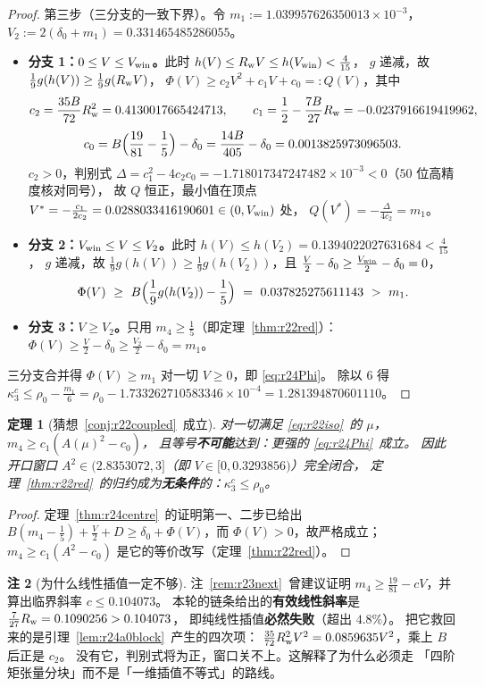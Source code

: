 \documentclass[UTF8,11pt]{ctexart}
\newtheorem{theorem}{定理}[section]
\theoremstyle{definition}
\newtheorem{remark}[theorem]{注}
\begin{document}
\begin{proof}
第三步（三分支的一致下界）。令
$m_1:=1.039957626350013\times10^{-3}$，$V_2:=2(\delta_0+m_1)=0.331465485286055$。
\begin{itemize}\itemsep3pt
\item \textbf{分支 1：$0\le V\le V_{\rm win}$。}此时 $h(V)\le R_{\rm w}V\le h(V_{\rm win})<\frac4{15}$，
$g$ 递减，故 $\frac19g(h(V))\ge\frac19g(R_{\rm w}V)$，
$\Phi(V)\ge c_2V^2+c_1V+c_0=:Q(V)$，其中
\[
c_2=\frac{35B}{72}R_{\rm w}^2=0.4130017665424713,\qquad
c_1=\frac12-\frac{7B}{27}R_{\rm w}=-0.0237916619419962,
\]
\[
c_0=B\Bigl(\frac{19}{81}-\frac15\Bigr)-\delta_0=\frac{14B}{405}-\delta_0=0.0013825973096503 .
\]
$c_2>0$，判别式 $\Delta=c_1^2-4c_2c_0=-1.718017347247482\times10^{-3}<0$（$50$ 位高精度核对同号），
故 $Q$ 恒正，最小值在顶点 $V^*=-\frac{c_1}{2c_2}=0.0288033416190601\in(0,V_{\rm win})$ 处，
$Q(V^*)=-\frac{\Delta}{4c_2}=m_1$。
\item \textbf{分支 2：$V_{\rm win}\le V\le V_2$。}此时 $h(V)\le h(V_2)=0.1394022027631684<\frac4{15}$，
$g$ 递减，故 $\frac19g(h(V))\ge\frac19g(h(V_2))$，且 $\frac V2-\delta_0\ge\frac{V_{\rm win}}2-\delta_0=0$，
\[
\Phi(V)\ \ge\ B\Bigl(\frac19g(h(V_2))-\frac15\Bigr)\ =\ 0.037825275611143\ >\ m_1 .
\]
\item \textbf{分支 3：$V\ge V_2$。}只用 $m_4\ge\frac15$（即定理~\ref{thm:r22red}）：
$\Phi(V)\ge\frac V2-\delta_0\ge\frac{V_2}2-\delta_0=m_1$。
\end{itemize}
三分支合并得 $\Phi(V)\ge m_1$ 对一切 $V\ge0$，即 \eqref{eq:r24Phi}。
除以 $6$ 得 $\kappa_3^c\le\rho_0-\frac{m_1}6=\rho_0-1.733262710583346\times10^{-4}=1.281394870601110$。
\end{proof}

\begin{theorem}[猜想~\ref{conj:r22coupled}~成立]\label{thm:r24conj}
对一切满足 \eqref{eq:r22iso}~的 $\mu$，$m_4\ge c_1(A(\mu)^2-c_0)$，
且等号\textbf{不可能}达到：更强的 \eqref{eq:r24Phi}~成立。
因此开口窗口 $A^2\in(2.8353072,3]$（即 $V\in[0,0.3293856)$）完全闭合，
定理~\ref{thm:r22red}~的归约成为\textbf{无条件}的：$\kappa_3^c\le\rho_0$。
\end{theorem}

\begin{proof}
定理~\ref{thm:r24centre}~的证明第一、二步已给出
$B(m_4-\frac15)+\frac V2+D\ge\delta_0+\Phi(V)$，而 $\Phi(V)>0$，故严格成立；
$m_4\ge c_1(A^2-c_0)$ 是它的等价改写（定理~\ref{thm:r22red}）。
\end{proof}

\begin{remark}[为什么线性插值一定不够]\label{rem:r24slope}
注~\ref{rem:r23next}~曾建议证明 $m_4\ge\frac{19}{81}-cV$，并算出临界斜率 $c\le0.104073$。
本轮的链条给出的\textbf{有效线性斜率}是 $\frac7{27}R_{\rm w}=0.1090256>0.104073$，
即纯线性插值\textbf{必然失败}（超出 $4.8\%$）。
把它救回来的是引理~\ref{lem:r24a0block}~产生的四次项：
$\frac{35}{72}R_{\rm w}^2V^2=0.0859635V^2$，乘上 $B$ 后正是 $c_2$。
没有它，判别式将为正，窗口关不上。这解释了为什么必须走
「四阶矩张量分块」而不是「一维插值不等式」的路线。
\end{remark}
\end{document}
